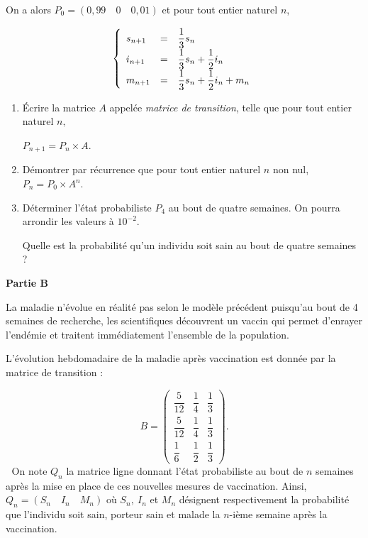 \documentclass[10pt]{article}
\begin{document}
On a alors $P_{0} = (0,99\quad 0\quad 0,01)$ et pour tout entier naturel $n$, 

\[\renewcommand\arraystretch{1.7}
\left\{\begin{array}{l c l}
s_{n+1}&=&\dfrac{1}{3}s_{n}\\
i_{n+1}&=&\dfrac{1}{3}s_{n} + \dfrac{1}{2}i_{n}\\
m_{n+1}&=&\dfrac{1}{3}s_{n} + \dfrac{1}{2}i_{n} + m_{n}
\end{array}\right.\]

\begin{enumerate}
\item Écrire la matrice $A$ appelée \emph{matrice de transition}, telle que pour tout entier naturel $n,\:$

$P_{n+1} = P_{n} \times A$.
\item Démontrer par récurrence que pour tout entier naturel $n$ non nul, 
$P_{n} = P_{0} \times A^n$.
\item Déterminer l'état probabiliste $P_{4}$ au bout de quatre semaines. On pourra arrondir les valeurs à $10^{- 2}$.
 
Quelle est la probabilité qu'un individu soit sain au bout de quatre semaines ? 
\end{enumerate}

\bigskip

\textbf{Partie B}

\medskip

La maladie n'évolue en réalité pas selon le modèle précédent puisqu'au bout de 4 semaines de recherche, les scientifiques découvrent un vaccin qui permet d'enrayer l'endémie et traitent immédiatement l'ensemble de la population.
 
L'évolution hebdomadaire de la maladie après vaccination est donnée par la matrice de transition : 

\renewcommand\arraystretch{1.7}
\[B = \begin{pmatrix}\dfrac{5}{12}&\dfrac{1}{4} &\dfrac{1}{3}\\
\dfrac{5}{12}&\dfrac{1}{4} &\dfrac{1}{3}\\
\dfrac{1}{6}&\dfrac{1}{2}&\dfrac{1}{3}
\end{pmatrix}.\]
\renewcommand\arraystretch{1}

On note $Q_{n}$ la matrice ligne donnant l'état probabiliste au bout de $n$ semaines après la mise en place de ces nouvelles mesures de vaccination. Ainsi, $Q_{n} = \left(S_{n}\quad I_{n}\quad M_{n}\right)$ où $S_{n},\: I_{n}$ et $M_{n}$ désignent respectivement la  probabilité que l'individu soit sain, porteur sain et malade la $n$-ième semaine après la vaccination. 
\end{document}
